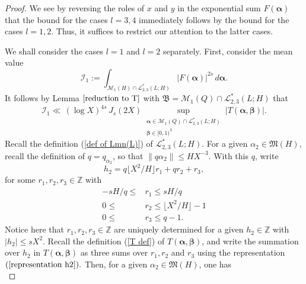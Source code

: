 \documentclass{amsart}%
\numberwithin{equation}{section}
\theoremstyle{remark}
\newcommand{\cI}{\mathcal I}
\newcommand{\Z}{\mathbb{Z}}
\newcommand{\1}{\mathbbm{1}}
\begin{document}
\begin{proof}
We see by reversing the roles of $x$ and $y$ in the exponential sum $F(\boldsymbol{\alpha})$ that the bound for the cases $l=3,4$ immediately follows by the bound for the cases $l=1,2$.  Thus, it suffices to restrict our attention to the latter cases.

We shall consider the cases $l=1$ and $l=2$ separately. 
First, consider the mean value
\begin{equation*}\label{mean value l=1}
   \cI_1 := \int_{\mathcal{M}_1(H)\cap \mathcal{L}^*_{2,3}(L;H)}|F(\boldsymbol{\alpha})|^{2s}\, d\boldsymbol{\alpha}.
\end{equation*}
It follows by Lemma $\ref{reduction to T}$ with $\mathfrak{B}=\mathcal{M}_1(Q)\cap \mathcal{L}^*_{2,3}(L;H)$ that 
\begin{equation}\label{bound for mean value over M_1cap L(2,3)}
\cI_1 \ll  \, (\log X)^{4s} \, J_s(2X) \sup_{\substack{\boldsymbol{\alpha}\in \mathcal{M}_1(Q)\cap \mathcal{L}^*_{2,3}(L;H)\\ \boldsymbol{\beta}\in [0,1)^3 }} |T(\boldsymbol{\alpha},\boldsymbol{\beta})|.
\end{equation}
 Recall the definition (\ref{def of Lmn(L)}) of $\mathcal{L}^*_{2,3}(L;H)$. For a given $\alpha_2\in \mathfrak{M}(H),$ recall the definition of $q=q_{\alpha_2}$, so that $\|q\alpha_2\| \le HX^{-3}$.  With this $q$,  write  
 \begin{equation}\label{representation h2}
     h_2= q\lfloor X^{2}/H\rfloor r_1+qr_2+r_3,
 \end{equation} for some $r_1,r_2,r_3\in \Z$ with 
\begin{equation}\label{ranges of r1r2r3}
    \begin{aligned}
        -sH/q\leq &r_1\leq sH/q\\
        0\leq &r_2\leq \lfloor X^{2}/H\rfloor-1\\
        0\leq &r_3\leq q-1.
    \end{aligned}
\end{equation}
Notice here that $r_1,r_2,r_3\in \Z$ are uniquely determined for a given $h_2\in\Z$ with $|h_2|\leq sX^{2}$. 
Recall the definition (\ref{T def}) of $T(\boldsymbol{\alpha},\boldsymbol{\beta})$, and write the summation over $h_2$ in $T(\boldsymbol{\alpha},\boldsymbol{\beta})$ as three sums over $r_1,r_2$ and $r_3$ using the representation $(\ref{representation h2}).$ Then, for a given $\alpha_2\in \mathfrak{M}(H)$,  one has
\begin{equation}\label{main estimate}

\end{equation}
\end{proof}
\end{document}
